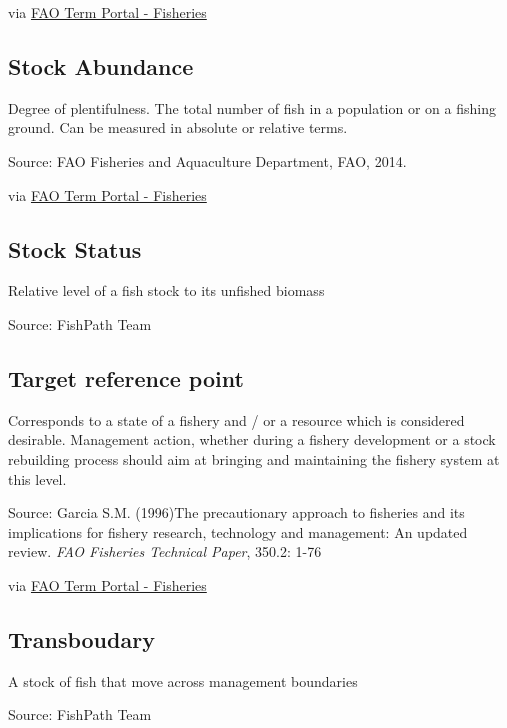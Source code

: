 \documentclass[
  11pt,
]{book}
\begin{document}
via \href{http://www.fao.org/fishery/glossary/en}{FAO Term Portal - Fisheries}

\hypertarget{stock-abundance}{%
\subsection{Stock Abundance}\label{stock-abundance}}

Degree of plentifulness. The total number of fish in a population or on a fishing ground. Can be measured in absolute or relative terms.

Source: FAO Fisheries and Aquaculture Department, FAO, 2014.

via \href{http://www.fao.org/fishery/glossary/en}{FAO Term Portal - Fisheries}

\hypertarget{stock-status}{%
\subsection{Stock Status}\label{stock-status}}

Relative level of a fish stock to its unfished biomass

Source: FishPath Team

\hypertarget{target-reference-point}{%
\subsection{Target reference point}\label{target-reference-point}}

Corresponds to a state of a fishery and / or a resource which is considered desirable. Management action, whether during a fishery development or a stock rebuilding process should aim at bringing and maintaining the fishery system at this level.

Source: Garcia S.M. (1996)The precautionary approach to fisheries and its implications for fishery research, technology and management: An updated review. \emph{FAO Fisheries Technical Paper}, 350.2: 1-76

via \href{http://www.fao.org/fishery/glossary/en}{FAO Term Portal - Fisheries}

\hypertarget{transboudary}{%
\subsection{Transboudary}\label{transboudary}}

A stock of fish that move across management boundaries

Source: FishPath Team
\end{document}
